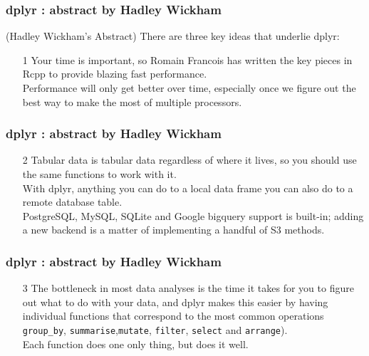 \documentclass{beamer}
\begin{document}
\begin{frame}
\frametitle{dplyr : abstract by Hadley Wickham}	
(Hadley Wickham's Abstract)
	\noindent There are three key ideas that underlie dplyr:
	
	\begin{enumerate}
		\item[1] Your time is important, so Romain Francois has written the key pieces in Rcpp to provide blazing fast performance. \\ Performance will only get better over time, especially once we figure out the best way to make the most of multiple processors. 
\end{enumerate}
\end{frame}
\begin{frame}
\frametitle{dplyr : abstract by Hadley Wickham}	

\begin{enumerate}
		\item[2] Tabular data is tabular data regardless of where it lives, so you should use the same functions to work with it. \\
		
		With dplyr, anything you can do to a local data frame you can also do to a remote database table. \\ PostgreSQL, MySQL, SQLite and Google bigquery support is built-in; adding a new backend is a matter of implementing a handful of S3 methods. 
\end{enumerate}
\end{frame}
\begin{frame}
\frametitle{dplyr : abstract by Hadley Wickham}	

	\begin{enumerate}
		\item[3] The bottleneck in most data analyses is the time it takes for you to figure out what to do with your data, and dplyr makes this easier by having individual functions that correspond to the most common operations  \texttt{group\_by}, \texttt{summarise},\texttt{mutate}, \texttt{filter}, \texttt{select} and \texttt{arrange}). \\ Each function does one only thing, but does it well.
	\end{enumerate}
\end{frame}
\end{document}
